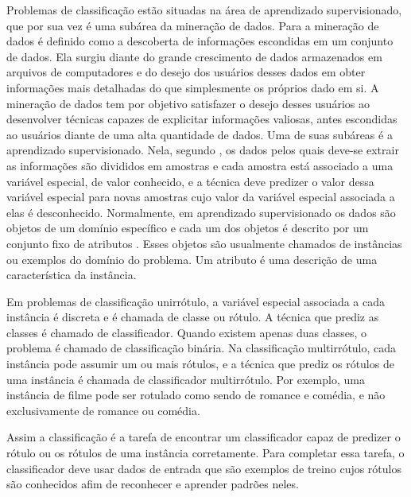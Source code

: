 Problemas de classificação estão situadas na área de aprendizado supervisionado, que por sua vez é uma 
subárea da mineração de dados. Para \cite{dunham2003introductory} a mineração de dados é definido como a descoberta
de informações escondidas em um conjunto de dados. Ela surgiu diante do grande crescimento de dados armazenados
em arquivos de computadores e do desejo dos usuários desses dados em obter informações mais detalhadas do que simplesmente
os próprios dado em si. A mineração de dados tem por objetivo satisfazer o desejo desses usuários ao desenvolver técnicas
capazes de explicitar informações valiosas, antes escondidas ao usuários diante de uma alta quantidade de dados.
Uma de suas subáreas é a aprendizado supervisionado. Nela, segundo \cite{mohri2012foundations},
os dados pelos quais deve-se extrair as informações são divididos em amostras
e cada amostra está associado a uma variável especial, de valor conhecido,
e a técnica deve predizer o valor dessa variável especial para
novas amostras cujo valor da variável especial associada a elas é desconhecido. 
Normalmente, em aprendizado supervisionado os dados são objetos de um domínio específico e cada um dos objetos
é descrito por um conjunto fixo de atributos \cite{rezende2003sistemas}. 
Esses objetos são usualmente chamados de instâncias ou exemplos do domínio do problema.
Um atributo é uma descrição de uma característica da instância.

Em problemas de classificação unirrótulo, a variável especial associada a cada instância é discreta
e é chamada de classe ou rótulo. A técnica que prediz as classes é chamado de classificador.
Quando existem apenas duas classes, o problema é chamado de classificação binária.
Na classificação multirrótulo, cada instância pode assumir um ou mais rótulos, e a técnica
que prediz os rótulos de uma instância é chamada de classificador multirrótulo.
Por exemplo, uma instância de filme pode ser rotulado como sendo de romance e comédia, 
e não exclusivamente de romance ou comédia.

Assim a classificação é a tarefa de encontrar um classificador capaz de predizer 
o rótulo ou os rótulos de uma instância corretamente.
Para completar essa tarefa, o classificador deve usar dados de entrada que são exemplos
de treino cujos rótulos são conhecidos afim de
reconhecer e aprender padrões neles.

